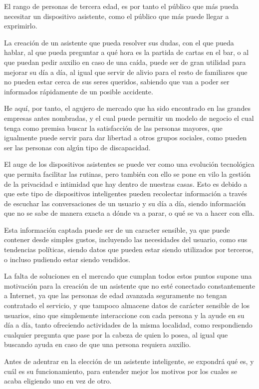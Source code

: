 El rango de personas de tercera edad, es por tanto el público que más pueda necesitar un dispositivo asistente, como el público que más puede llegar a exprimirlo.

La creación de un asistente que pueda resolver sus dudas, con el que pueda hablar, al que pueda preguntar a qué hora es la partida de cartas en el bar, o al que puedan pedir auxilio en caso de una caída, puede ser de gran utilidad para mejorar su día a día, al igual que servir de alivio para el resto de familiares que no pueden estar cerca de sus seres queridos, sabiendo que van a poder ser informados rápidamente de un posible accidente.

He aquí, por tanto, el agujero de mercado que ha sido encontrado en las grandes empresas antes nombradas, y el cual puede permitir un modelo de negocio el cual tenga como premisa buscar la satisfacción de las personas mayores, que igualmente puede servir para dar libertad a otros grupos sociales, como pueden ser las personas con algún tipo de discapacidad.

El auge de los dispositivos asistentes se puede ver como una evolución tecnológica que permita facilitar las rutinas, pero también con ello se pone en vilo la gestión de la privacidad e intimidad que hay dentro de nuestras casas. Esto es debido a que este tipo de dispositivos inteligentes pueden recolectar información a través de escuchar las conversaciones de un usuario y su día a día, siendo información que no se sabe de manera exacta a dónde va a parar, o qué se va a hacer con ella.

Esta información captada puede ser de un caracter sensible, ya que puede contener desde simples gustos, incluyendo las necesidades del usuario, como sus tendencias políticas, siendo datos que pueden estar siendo utilizados por terceros, o incluso pudiendo estar siendo vendidos.

La falta de soluciones en el mercado que cumplan todos estos puntos supone una motivación para la creación de un asistente que no esté conectado constantemente a Internet, ya que las personas de edad avanzada seguramente no tengan contratado el servicio, y que tampoco almacene datos de carácter sensible de los usuarios, sino que simplemente interaccione con cada persona y la ayude en su día a día, tanto ofreciendo actividades de la misma localidad, como respondiendo cualquier pregunta que pase por la cabeza de quien lo posea, al igual que buscando ayuda en caso de que una persona requiera auxilio.

Antes de adentrar en la elección de un asistente inteligente, se expondrá qué es, y cuál es su funcionamiento, para entender mejor los motivos por los cuales se acaba eligiendo uno en vez de otro.

